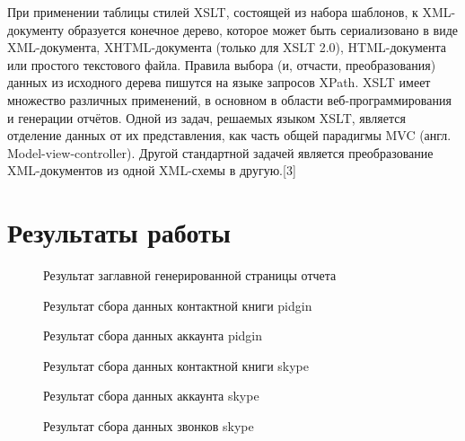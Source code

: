 При применении таблицы стилей XSLT, состоящей из набора шаблонов, к XML-документу образуется конечное дерево, которое может быть сериализовано в виде XML-документа, XHTML-документа (только для XSLT 2.0), HTML-документа или простого текстового файла. Правила выбора (и, отчасти, преобразования) данных из исходного дерева пишутся на языке запросов XPath.
XSLT имеет множество различных применений, в основном в области веб-программирования и генерации отчётов. Одной из задач, решаемых языком XSLT, является отделение данных от их представления, как часть общей парадигмы MVC (англ. Model-view-controller). Другой стандартной задачей является преобразование XML-документов из одной XML-схемы в другую.[3]
\chapter*{Результаты работы}

\begin{figure}[h]
\caption{Результат заглавной генерированной страницы отчета}
\label{pic:xml_to_xslt1}
\end{figure}

\begin{figure}[h]
\caption{Результат сбора данных контактной книги pidgin}
\label{pic:xml_to_xslt2}
\end{figure}

\begin{figure}[h]
\caption{Результат сбора данных аккаунта pidgin}
\label{pic:xml_to_xslt3}
\end{figure}

\begin{figure}[h]
\caption{Результат сбора данных контактной книги skype}
\label{pic:xml_to_xslt4}
\end{figure}

\begin{figure}[h]
\caption{Результат сбора данных аккаунта skype}
\label{pic:xml_to_xslt5}
\end{figure}

\begin{figure}[h]
\caption{Результат сбора данных звонков skype}
\label{pic:xml_to_xslt6}
\end{figure}

